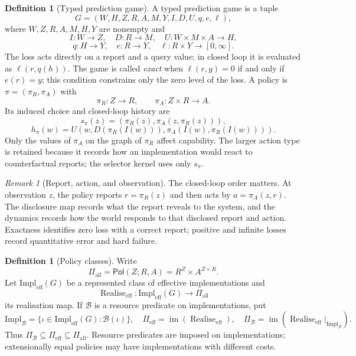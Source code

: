\documentclass[11pt]{article}
\theoremstyle{plain}
\theoremstyle{definition}
\newtheorem{definition}[theorem]{Definition}
\theoremstyle{remark}
\newtheorem{remark}[theorem]{Remark}
\newcommand{\im}{\operatorname{im}}
\newcommand{\Pol}{\mathsf{Pol}}
\newcommand{\realise}{\operatorname{Realise}}
\begin{document}
\begin{definition}[Typed prediction game]\label{def:game}
A typed prediction game is a tuple
\[
G=(W,H,Z,R,A,M,Y,I,D,U,q,e,\ell),
\]
where $W,Z,R,A,M,H,Y$ are nonempty and
\[
I:W\to Z,\quad D:R\to M,\quad U:W\times M\times A\to H,
\]
\[
q:H\to Y,\quad e:R\to Y,\quad \ell:R\times Y\to[0,\infty].
\]
The loss acts directly on a report and a query value; in closed loop it is
evaluated as $\ell(r,q(h))$. The game is called \emph{exact} when
$\ell(r,y)=0$ if and only if $e(r)=y$; this condition constrains only the zero
level of the loss. A policy is
$\pi=(\pi_R,\pi_A)$ with
\[
\pi_R:Z\to R,\qquad \pi_A:Z\times R\to A.
\]
Its induced choice and closed-loop history are
\[
s_\pi(z)=(\pi_R(z),\pi_A(z,\pi_R(z))),
\]
\[
h_\pi(w)=U(w,D(\pi_R(I(w))),\pi_A(I(w),\pi_R(I(w)))).
\]
Only the values of $\pi_A$ on the graph of $\pi_R$ affect capability. The larger
action type is retained because it records how an implementation would react to
counterfactual reports; the selector kernel uses only $s_\pi$.
\end{definition}

\begin{remark}[Report, action, and observation]
The closed-loop order matters. At observation $z$, the policy reports
$r=\pi_R(z)$ and then acts by $a=\pi_A(z,r)$. The disclosure map records what the
report reveals to the system, and the dynamics records how the world responds to
that disclosed report and action. Exactness identifies zero loss with a correct
report; positive and infinite losses record quantitative error and hard failure.
\end{remark}

\begin{definition}[Policy classes]\label{def:realise}
Write
\[
\Pi_{\mathrm{all}}=\Pol(Z;R,A)=R^Z\times A^{Z\times R}.
\]
Let $\mathrm{Impl}_{\mathrm{eff}}(G)$ be a represented class of effective
implementations and
\[
\realise_{\mathrm{eff}}:\mathrm{Impl}_{\mathrm{eff}}(G)
\to\Pi_{\mathrm{all}}
\]
its realisation map. If $\mathcal B$ is a resource predicate on implementations,
put
\[
\mathrm{Impl}_{\mathcal B}
=\{\iota\in\mathrm{Impl}_{\mathrm{eff}}(G):\mathcal B(\iota)\},\quad
\Pi_{\mathrm{eff}}=\im(\realise_{\mathrm{eff}}),\quad
\Pi_{\mathcal B}=\im(\realise_{\mathrm{eff}}|_{\mathrm{Impl}_{\mathcal B}}).
\]
Thus $\Pi_{\mathcal B}\subseteq\Pi_{\mathrm{eff}}\subseteq\Pi_{\mathrm{all}}$.
Resource predicates are imposed on implementations; extensionally equal policies
may have implementations with different costs.
\end{definition}
\end{document}
